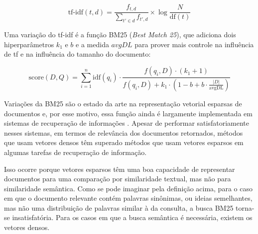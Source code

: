 \documentclass[
	12pt,				%
	openright,			%
	oneside,			%
	a4paper,			%
	english,			%
	french,				%
	spanish,			%
	brazil				%
	]{abntex2}
\begin{document}
\begin{equation}
\text{tf-idf}(t, d) = \frac{f_{t, d}}{\sum_{t' \in d} f_{t', d}} \times \log \frac{N}{\text{df}(t)}
\label{eq:tfidf_expanded}
\end{equation}

Uma variação do tf-idf é a função BM25 (\textit{Best Match 25}), que adiciona dois hiperparâmetros $k_1$ e $b$ e a medida $avgDL$ para prover mais controle na influência de tf e na influência do tamanho do documento: \cite{wikipedia2023okapibm25}

\begin{equation}
\text{score}(D,Q) = \sum_{i=1}^{n} \text{idf}(q_i) \cdot \frac{f(q_i, D) \cdot (k_1 + 1)}{f(q_i, D) + k_1 \cdot \left(1 - b + b \cdot \frac{|D|}{\text{avgDL}}\right)}
\label{eq:bm25}
\end{equation}

Variações da BM25 são o estado da arte na representação vetorial esparsas de documentos e, por esse motivo, essa função ainda é largamente implementada em sistemas de recuperação de informações \cite{}. Apesar de performar satisfatoriamente nesses sistemas, em termos de relevância dos documentos retornados, métodos que usam vetores densos têm superado métodos que usam vetores esparsos em algumas tarefas de recuperação de informação. \cite{thakur-2021-BEIR}



Isso ocorre porque vetores esparsos têm uma boa capacidade de representar documentos para uma comparação por similaridade textual, mas não para similaridade semântica. Como se pode imaginar pela definição acima, para o caso em que o documento relevante contém palavras sinônimas, ou ideias semelhantes, mas não uma distribuição de palavras similar à da consulta, a busca BM25 torna-se insatisfatória. \cite{thakur-2021-BEIR} Para os casos em que a busca semântica é necessária, existem os vetores densos.
\end{document}
